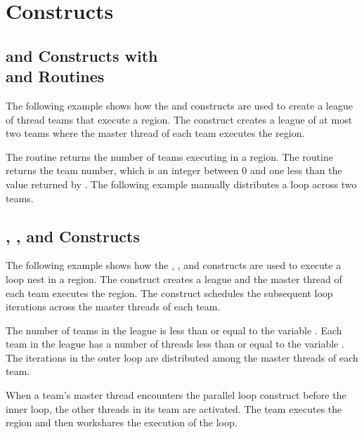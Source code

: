 \pagebreak
\section{ Constructs}
\label{sec:teams}

\subsection{ and  Constructs with \\
and  Routines}
\label{subsec:teams_api}

The following example shows how the  and  constructs 
are used to create a league of thread teams that execute a region. The  
construct creates a league of at most two teams where the master thread of each 
team executes the  region.

The  routine returns the number of teams executing in a  
region. The  routine returns the team number, which is an integer 
between 0 and one less than the value returned by . The following 
example manually distributes a loop across two teams.



\subsection{, , and  Constructs}
\label{subsec:teams_distribute}

The following example shows how the , , and  
constructs are used to execute a loop nest in a  region. The  
construct creates a league and the master thread of each team executes the  
region. The  construct schedules the subsequent loop iterations 
across the master threads of each team.

The number of teams in the league is less than or equal to the variable . 
Each team in the league has a number of threads less than or equal to the variable 
. The iterations in the outer loop are distributed among the master 
threads of each team.

When a team's master thread encounters the parallel loop construct before the inner 
loop, the other threads in its team are activated. The team executes the  
region and then workshares the execution of the loop.

